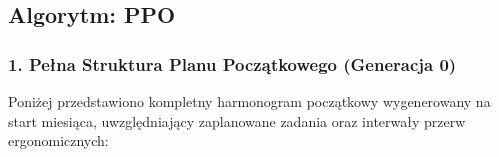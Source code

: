 
\subsection{Algorytm: PPO}

\subsubsection*{1. Pełna Struktura Planu Początkowego (Generacja 0)}
Poniżej przedstawiono kompletny harmonogram początkowy wygenerowany na start miesiąca, uwzględniający zaplanowane zadania oraz interwały przerw ergonomicznych:

